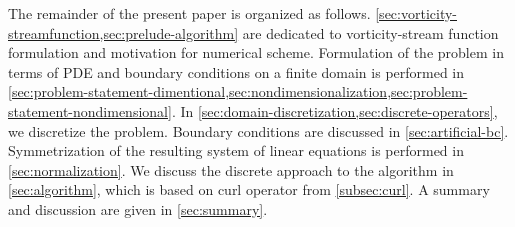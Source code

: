 \documentclass{article}
\numberwithin{equation}{section}
\begin{document}
The remainder of the present paper is organized as follows. 
	\cref{sec:vorticity-streamfunction,sec:prelude-algorithm} are dedicated to vorticity-stream function formulation and motivation for numerical scheme. 
	Formulation of the problem in terms of PDE and boundary conditions on a finite domain is performed in \cref{sec:problem-statement-dimentional,sec:nondimensionalization,sec:problem-statement-nondimensional}. 
	In \cref{sec:domain-discretization,sec:discrete-operators}, we discretize the problem. 
	Boundary conditions are discussed in \cref{sec:artificial-bc}. 
	Symmetrization of the resulting system of linear equations is performed in \cref{sec:normalization}.
	We discuss the discrete approach to the algorithm in \cref{sec:algorithm}, which is based on curl operator from \cref{subsec:curl}. 
	A summary and discussion are given in \cref{sec:summary}.
	
\end{document}
